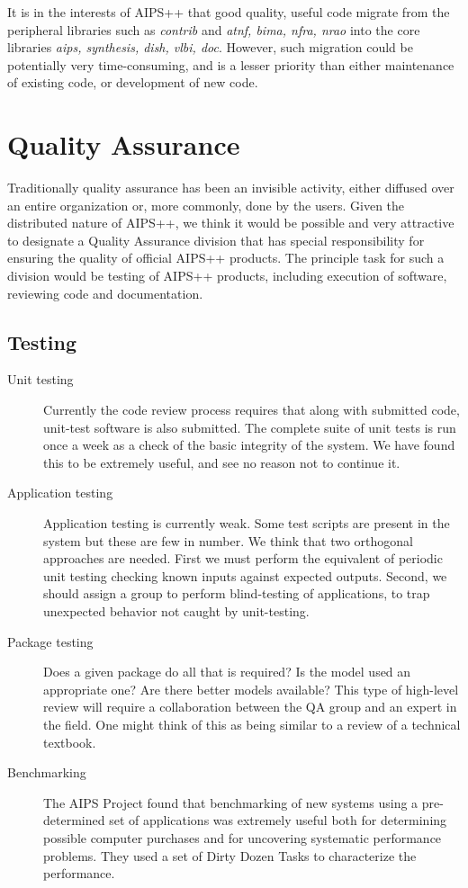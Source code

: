 It is in the interests of AIPS++ that good quality, useful code
migrate from the peripheral libraries such as {\em contrib} and {\em
atnf, bima, nfra, nrao} into the core libraries {\em aips, synthesis,
dish, vlbi, doc}. However, such migration could be potentially very
time-consuming, and is a lesser priority than either maintenance
of existing code, or development of new code.

\section{Quality Assurance}

Traditionally quality assurance has been an invisible activity, either
diffused over an entire organization or, more commonly, done by the
users. Given the distributed nature of AIPS++, we think it would be
possible and very attractive to designate a Quality Assurance division
that has special responsibility for ensuring the quality of official
AIPS++ products. The principle task for such a division would be
testing of AIPS++ products, including execution of software, reviewing
code and documentation.

\subsection{Testing}
\begin{description}
\item[Unit testing] Currently the code review process requires that
along with submitted code, unit-test software is also submitted.
The complete suite of unit tests is run once a week
as a check of the basic integrity of the system. We have found this 
to be extremely useful, and see no reason not to continue it.
\item[Application testing] Application testing is currently
weak. Some test scripts are present in the system but these are few in
number. We think that two orthogonal approaches are needed. First we
must perform the equivalent of periodic unit testing checking
known inputs against expected outputs. Second, we
should assign a group to perform blind-testing of applications,
to trap unexpected behavior not caught by unit-testing.
\item[Package testing] Does a given package do all that is
required? Is the model used an appropriate one? Are there
better models available? This type of high-level review will
require a collaboration between the QA group and an expert in
the field. One might think of this as being similar to a review
of a technical textbook.
\item[Benchmarking] The AIPS Project found that benchmarking of
new systems using a pre-determined set of applications was
extremely useful both for determining possible computer purchases
and for uncovering systematic performance problems. They used a 
set of Dirty Dozen Tasks to characterize the performance.
\end{description}

